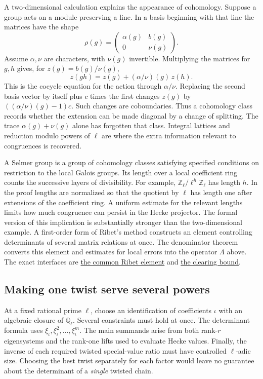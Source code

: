 \documentclass[11pt,letterpaper]{article}
\newcommand{\sref}[2]{\href{https://github.com/VladimirReshetnikov/ProveIt/blob/d8415e76ad850651f8c0083afe689dd9f4a45a10/Analysis/GeneralizedRiemannHypothesis/vendor/grh-lean/grh/src/#1.lean}{#2}}
\begin{document}
A two-dimensional calculation explains the appearance of cohomology. Suppose a group acts on a module preserving a line. In a basis beginning with that line the matrices have the shape
\[
 \rho(g)=\begin{pmatrix}\alpha(g)&b(g)\\0&\nu(g)\end{pmatrix}.
\]
Assume \(\alpha,\nu\) are characters, with \(\nu(g)\) invertible. Multiplying the matrices for \(g,h\) gives, for \(z(g)=b(g)/\nu(g)\),
\[
 z(gh)=z(g)+(\alpha/\nu)(g)\,z(h).
\]
This is the cocycle equation for the action through \(\alpha/\nu\). Replacing the second basis vector by itself plus \(c\) times the first changes \(z(g)\) by \(((\alpha/\nu)(g)-1)c\). Such changes are coboundaries. Thus a cohomology class records whether the extension can be made diagonal by a change of splitting. The trace \(\alpha(g)+\nu(g)\) alone has forgotten that class. Integral lattices and reduction modulo powers of \(\ell\) are where the extra information relevant to congruences is recovered.

A Selmer group is a group of cohomology classes satisfying specified conditions on restriction to the local Galois groups. Its length over a local coefficient ring counts the successive layers of divisibility. For example, \(\mathbb Z_\ell/\ell^h\mathbb Z_\ell\) has length \(h\). In the proof lengths are normalized so that the quotient by \(\ell\) has length one after extensions of the coefficient ring. A uniform estimate for the relevant lengths limits how much congruence can persist in the Hecke projector. The formal version of this implication is substantially stronger than the two-dimensional example. A first-order form of Ribet's method constructs an element controlling determinants of several matrix relations at once. The denominator theorem converts this element and estimates for local errors into the operator \(\Lambda\) above. The exact interfaces are \sref{New/Congruences/FirstOrder/RibetLemma}{the common Ribet element} and \sref{New/Congruences/FirstOrder/DenominatorBound}{the clearing bound}.

\subsection{Making one twist serve several powers}
At a fixed rational prime \(\ell\), choose an identification of coefficients \(\iota\) with an algebraic closure of \(\mathbb Q_\ell\). Several constraints must hold at once. The determinant formula uses \(\xi_\iota,\xi_\iota^2,\ldots,\xi_\iota^m\). The main summands arise from both rank-\(r\) eigensystems and the rank-one lifts used to evaluate Hecke values. Finally, the inverse of each required twisted special-value ratio must have controlled \(\ell\)-adic size. Choosing the best twist separately for each factor would leave no guarantee about the determinant of a \emph{single} twisted chain.
\end{document}
